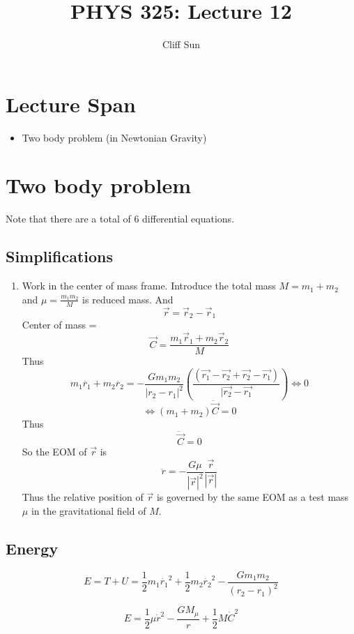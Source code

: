 \documentclass{article}
\title{PHYS 325: Lecture 12}
\author{Cliff Sun}
\newtheorem{one minute paper}[theorem]{One Minute Paper}
\begin{document}
\maketitle

\section*{Lecture Span}
\begin{itemize}
    \item Two body problem (in Newtonian Gravity)
\end{itemize}

\section*{Two body problem}

Note that there are a total of 6 differential equations. 

\subsection*{Simplifications}
\begin{enumerate}
    \item Work in the center of mass frame. Introduce the total mass $M = m_1 + m_2$ and $\mu = \frac{m_1m_2}{M}$ is reduced mass. And 
    \begin{equation}
        \vec{r} = \vec{r}_2 - \vec{r}_1
    \end{equation}
    Center of mass = 
    \begin{equation}
        \vec{C} = \frac{m_1\vec{r}_1 + m_2\vec{r}_2}{M}
    \end{equation}
    Thus 
    \begin{equation}
        m_1\ddot{r_1} + m_2\ddot{r_2} = -\frac{Gm_1m_2}{|r_2-r_1|^2} (\frac{(\vec{r_1}-\vec{r_2} + \vec{r_2} - \vec{r_1})}{|\vec{r_2} - \vec{r_1}}) \iff 0
    \end{equation}
    \begin{equation}
        \iff (m_1 + m_2)\ddot{\vec{C}} = 0
    \end{equation}
    Thus
    \begin{equation}
        \ddot{\vec{C}} = 0
    \end{equation}
    So the EOM of $\vec{r}$ is 
    \begin{equation}
        \ddot{r} = -\frac{G\mu}{|\vec{r}|^2}\frac{\vec{r}}{|\vec{r}|}
    \end{equation}
    Thus the relative position of $\vec{r}$ is governed by the same EOM as a test mass $\mu$ in the 
    gravitational field of $M$. 
\end{enumerate}

\subsection*{Energy}

\begin{equation}
    E = T + U = \frac{1}{2}m_1\dot{r_1}^2 + \frac{1}{2}m_2\dot{r_2}^2 - \frac{Gm_1m_2}{(r_2-r_1)^2}
\end{equation}

\begin{equation}
    E = \frac{1}{2}\mu\dot{r}^2 - \frac{GM_\mu}{r} + \frac{1}{2}M\dot{C}^2
\end{equation}
\end{document}
